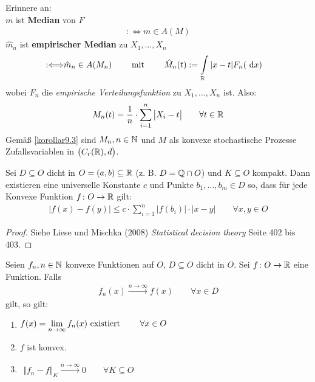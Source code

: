 Erinnere an:\\
$m$ ist \textbf{Median} von $F$
\begin{align*}
	:\Longleftrightarrow m\in A(M)
\end{align*}
$\hat{m}_n$ ist \textbf{empirischer Median} zu $X_1,\ldots,X_n$
\begin{align*}
	:\Longleftrightarrow&\hat{m}_n\in A(M_n)
	\qquad\text{ mit }\qquad
	\hat{M}_n(t):=\int\limits_{\mathbb{R}}|x-t| F_n(\text{ d} x)
\end{align*}
wobei $F_n$ die \textit{empirische Verteilungsfunktion} zu $X_1,\ldots,X_n$ ist.
Also:
\begin{align*}
	M_n(t)=\frac{1}{n}\cdot\sum\limits_{i=1}^n\big|X_i-t\big|\qquad\forall t\in\mathbb{R}
\end{align*}
Gemäß \ref{korollar9.3} sind $M_n,n\in\mathbb{N}$ und $M$ als	 konvexe stochastische Prozesse Zufallsvariablen in $\big(C_r(\mathbb{R}),d\big)$.

\begin{satz}\label{satz9.7}
	Sei $D\subseteq O$ dicht in $O=(a,b)\subseteq\mathbb{R}$ (z. B. $D=\mathbb{Q}\cap O$) und $K\subseteq O$ kompakt.
	Dann existieren eine universelle Konstante $c$ und Punkte $b_1,\ldots,b_m\in D$ so, dass für jede Konvexe Funktion $f\colon O\to\mathbb{R}$ gilt:
	\begin{align*}
		\big|f(x)-f(y)\big|\leq c\cdot\sum\limits_{i=1}^n\big|f(b_i)\big|\cdot|x-y|\qquad\forall x,y\in O
	\end{align*}
\end{satz}

\begin{proof}
	Siehe Liese und Mischka (2008) \textit{Statistical decision theory} Seite 402 bis 403.
\end{proof}


\begin{theorem}\label{theorem9.8}
	Seien $f_n,n\in\mathbb{N}$ konvexe Funktionen auf $O$, $D\subseteq O$ dicht in $O$.
	Sei $f\colon O\to\mathbb{R}$ eine Funktion.
	Falls 
	\begin{align}\label{eqtheorem9.8Stern}\tag{$\ast$}
		f_n(x)\overset{n\to\infty}{\longrightarrow} f(x)\qquad\forall x\in D
	\end{align}
	gilt, so gilt:
	\begin{enumerate}[label=(\arabic*)]
		\item $\begin{aligned}
			f(x)=\lim\limits_{n\to\infty} f_n(x)\text{ existiert }\qquad\forall x\in O
		\end{aligned}$
		\item $f$ ist konvex.
		\item $\begin{aligned}
			\big\Vert f_n-f\big\Vert_K\overset{n\to\infty}{\longrightarrow}0\qquad\forall K\subseteq O
		\end{aligned}$
	\end{enumerate}
\end{theorem}

